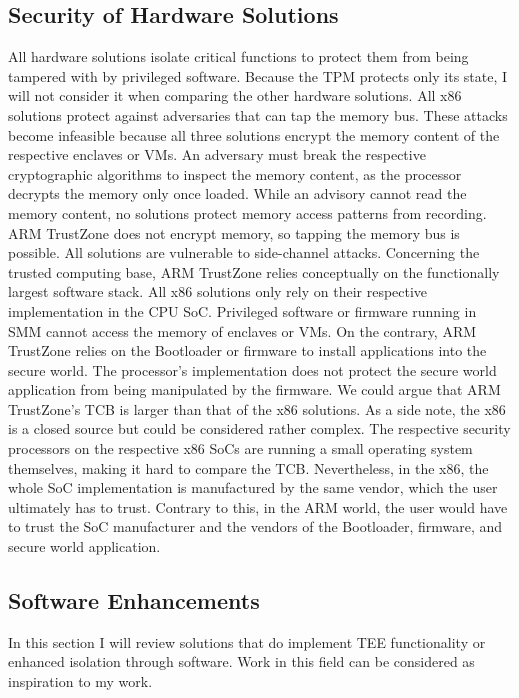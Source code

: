 \subsection{Security of Hardware Solutions}
All hardware solutions isolate critical functions to protect them from being
tampered with by privileged software. Because the TPM protects only its
state, I will not consider it when comparing the other hardware solutions. All x86
solutions protect against adversaries that can tap the memory bus. These attacks
become infeasible because all three solutions encrypt the memory content of the
respective enclaves or VMs. An adversary must break the respective cryptographic
algorithms to inspect the memory content, as the processor decrypts the memory
only once loaded. While an advisory cannot read the memory content, no solutions
protect memory access patterns from recording. ARM TrustZone does not encrypt
memory, so tapping the memory bus is possible. All solutions are vulnerable to
side-channel attacks. Concerning the trusted computing base, ARM TrustZone
relies conceptually on the functionally largest software stack. All x86
solutions only rely on their respective implementation in the CPU SoC.
Privileged software or firmware running in SMM cannot access the memory of
enclaves or VMs. On the contrary, ARM TrustZone relies on the Bootloader or
firmware to install applications into the secure world. The processor's
implementation does not protect the secure world application from being
manipulated by the firmware. We could argue that ARM TrustZone's TCB is larger
than that of the x86 solutions. As a side note, the x86 is a closed source but
could be considered rather complex. The respective security processors on the
respective x86 SoCs are running a small operating system themselves, making it
hard to compare the TCB. Nevertheless, in the x86, the whole SoC implementation
is manufactured by the same vendor, which the user ultimately has to trust.
Contrary to this, in the ARM world, the user would have to trust the SoC
manufacturer and the vendors of the Bootloader, firmware, and secure world
application.\\

\subsection{Software Enhancements}
In this section I will review solutions that do implement TEE functionality or
enhanced isolation through software. Work in this field can be considered as
inspiration to my work.

